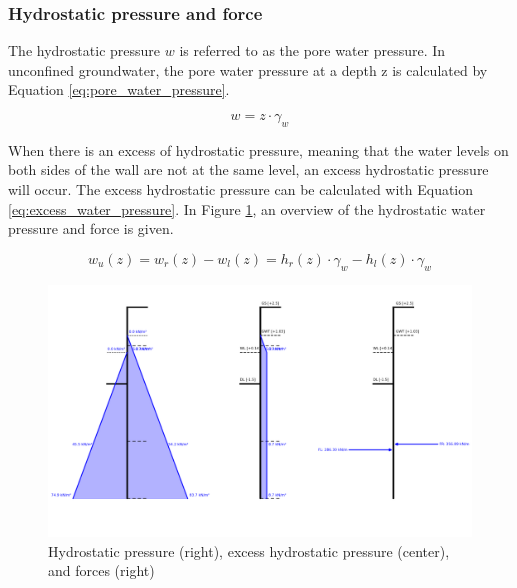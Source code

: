 \newpage

\subsubsection{Hydrostatic pressure and force}

The hydrostatic pressure $w$ is referred to as the pore water pressure. In unconfined groundwater, the pore water pressure at a depth z is calculated by Equation \ref{eq:pore_water_pressure}.

\begin{equation}
    w = z \cdot \gamma_{w}
    \label{eq:pore_water_pressure}
\end{equation}

When there is an excess of hydrostatic pressure, meaning that the water levels on both sides of the wall are not at the same level, an excess hydrostatic pressure will occur. The excess hydrostatic pressure can be calculated with Equation \ref{eq:excess_water_pressure}. In Figure \ref{fig:hydrostatic_excess_pressure}, an overview of the hydrostatic water pressure and force is given.

\begin{equation}
    w_{u}(z) = w_{r}(z) - w_{l}(z) = h_{r}(z) \cdot \gamma_{w} - h_{l}(z) \cdot \gamma_{w}
    \label{eq:excess_water_pressure}
\end{equation}

\begin{figure}[H]
    \centering
    \includegraphics[width=0.75\linewidth]{figures/ch8/water_overview.png}
    \caption{Hydrostatic pressure (right), excess hydrostatic pressure (center), and forces (right)}
    \label{fig:hydrostatic_excess_pressure}
\end{figure}

